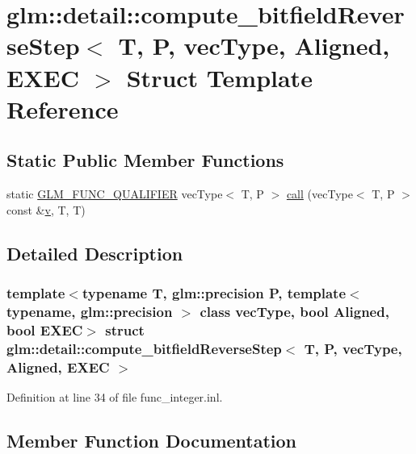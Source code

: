 \hypertarget{structglm_1_1detail_1_1compute__bitfield_reverse_step}{}\section{glm\+::detail\+::compute\+\_\+bitfield\+Reverse\+Step$<$ T, P, vec\+Type, Aligned, E\+X\+EC $>$ Struct Template Reference}
\label{structglm_1_1detail_1_1compute__bitfield_reverse_step}
\subsection*{Static Public Member Functions}
\begin{DoxyCompactItemize}
\item 
static \mbox{\hyperlink{setup_8hpp_a33fdea6f91c5f834105f7415e2a64407}{G\+L\+M\+\_\+\+F\+U\+N\+C\+\_\+\+Q\+U\+A\+L\+I\+F\+I\+ER}} vec\+Type$<$ T, P $>$ \mbox{\hyperlink{structglm_1_1detail_1_1compute__bitfield_reverse_step_a4dbbf3d91b30ab5a0f2cbfa59ab27787}{call}} (vec\+Type$<$ T, P $>$ const \&\mbox{\hyperlink{glad_8h_a14cfbe2fc2234f5504618905b69d1e06}{v}}, T, T)
\end{DoxyCompactItemize}


\subsection{Detailed Description}
\subsubsection*{template$<$typename T, glm\+::precision P, template$<$ typename, glm\+::precision $>$ class vec\+Type, bool Aligned, bool E\+X\+EC$>$\newline
struct glm\+::detail\+::compute\+\_\+bitfield\+Reverse\+Step$<$ T, P, vec\+Type, Aligned, E\+X\+E\+C $>$}



Definition at line 34 of file func\+\_\+integer.\+inl.



\subsection{Member Function Documentation}
\mbox{\label{structglm_1_1detail_1_1compute__bitfield_reverse_step_a4dbbf3d91b30ab5a0f2cbfa59ab27787}} 
